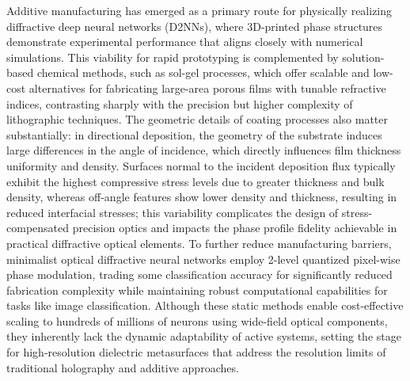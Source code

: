 Additive manufacturing has emerged as a primary route for physically realizing diffractive deep neural networks (D2NNs), where 3D-printed phase structures demonstrate experimental performance that aligns closely with numerical simulations. This viability for rapid prototyping is complemented by solution-based chemical methods, such as sol-gel processes, which offer scalable and low-cost alternatives for fabricating large-area porous films with tunable refractive indices, contrasting sharply with the precision but higher complexity of lithographic techniques. The geometric details of coating processes also matter substantially: in directional deposition, the geometry of the substrate induces large differences in the angle of incidence, which directly influences film thickness uniformity and density. Surfaces normal to the incident deposition flux typically exhibit the highest compressive stress levels due to greater thickness and bulk density, whereas off-angle features show lower density and thickness, resulting in reduced interfacial stresses; this variability complicates the design of stress-compensated precision optics and impacts the phase profile fidelity achievable in practical diffractive optical elements. To further reduce manufacturing barriers, minimalist optical diffractive neural networks employ 2-level quantized pixel-wise phase modulation, trading some classification accuracy for significantly reduced fabrication complexity while maintaining robust computational capabilities for tasks like image classification. Although these static methods enable cost-effective scaling to hundreds of millions of neurons using wide-field optical components, they inherently lack the dynamic adaptability of active systems, setting the stage for high-resolution dielectric metasurfaces that address the resolution limits of traditional holography and additive approaches. \citep{doi_10_1126_science_aat8084_e055772d} \citep{doi_10_1038_s41598_025_33607_1_2162f081} \citep{doi_10_1002_lpor_202402303_1f555bd4} \citep{doi_10_1116_1_5011790_9ce3fdef}

